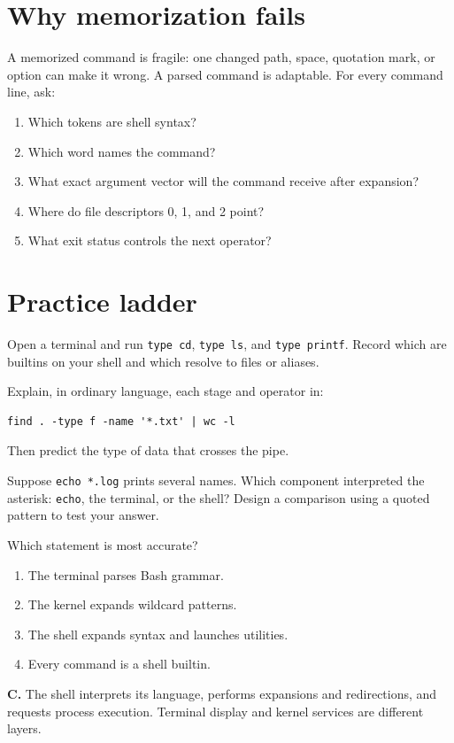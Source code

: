 \documentclass[11pt,oneside,openany]{book}
\newcommand{\fourchoices}[4]{%
  \begin{enumerate}[label=\Alph*),leftmargin=2em,itemsep=0.25em]
    \item #1
    \item #2
    \item #3
    \item #4
  \end{enumerate}}
\begin{document}
\section{Why memorization fails}
A memorized command is fragile: one changed path, space, quotation mark, or option can make it wrong. A parsed command is adaptable. For every command line, ask:
\begin{enumerate}
  \item Which tokens are shell syntax?
  \item Which word names the command?
  \item What exact argument vector will the command receive after expansion?
  \item Where do file descriptors 0, 1, and 2 point?
  \item What exit status controls the next operator?
\end{enumerate}

\section{Practice ladder}
\begin{practicebox}[title={Easy -- identify the layers}]
Open a terminal and run \texttt{type cd}, \texttt{type ls}, and \texttt{type printf}. Record which are builtins on your shell and which resolve to files or aliases.
\end{practicebox}
\begin{practicebox}[title={Medium -- narrate a command}]
Explain, in ordinary language, each stage and operator in:
\begin{lstlisting}
find . -type f -name '*.txt' | wc -l
\end{lstlisting}
Then predict the type of data that crosses the pipe.
\end{practicebox}
\begin{practicebox}[title={Hard -- locate responsibility}]
Suppose \texttt{echo *.log} prints several names. Which component interpreted the asterisk: \texttt{echo}, the terminal, or the shell? Design a comparison using a quoted pattern to test your answer.
\end{practicebox}

\begin{questionbox}[title={Medium 1.1 -- Architecture}]
Which statement is most accurate?
\fourchoices{The terminal parses Bash grammar.}{The kernel expands wildcard patterns.}{The shell expands syntax and launches utilities.}{Every command is a shell builtin.}
\end{questionbox}
\begin{answerbox}
\textbf{C.} The shell interprets its language, performs expansions and redirections, and requests process execution. Terminal display and kernel services are different layers.
\end{answerbox}
\end{document}
